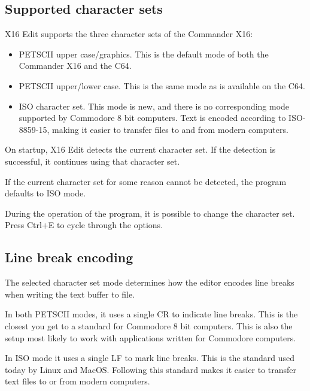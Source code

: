 \documentclass{article}
\begin{document}
    \subsection{Supported character sets}

        X16 Edit supports the three character sets of the Commander X16:

        \begin{itemize}
            \item PETSCII upper case/graphics. This is the default mode of both the Commander X16 and the C64.

            \item PETSCII upper/lower case. This is the same mode as is available on the C64.

            \item ISO character set. This mode is new, and there is no corresponding mode supported by 
            Commodore 8 bit computers. Text is encoded according to ISO-8859-15, making it
            easier to transfer files to and from modern computers.
        \end{itemize}

        \noindent On startup, X16 Edit detects the current character set. If the detection is successful, it
        continues using that character set.

        If the current character set for some reason cannot be detected, the program defaults to ISO mode.

        During the operation of the program, it is possible to change the character set. Press Ctrl+E to cycle
        through the options.

    \subsection{Line break encoding}

        The selected character set mode determines how the editor encodes line breaks when writing the
        text buffer to file. 
        
        In both PETSCII modes, it uses a single CR to indicate line breaks. This
        is the closest you get to a standard for Commodore 8 bit computers. This is also the
        setup most likely to work with applications written for Commodore computers.
        
        In ISO mode it uses
        a single LF to mark line breaks. This is the standard used today by Linux and MacOS. Following
        this standard makes it easier to transfer text files to or from modern computers.
\end{document}
